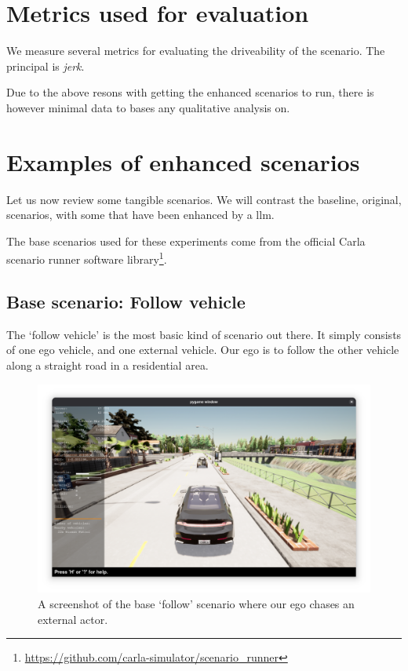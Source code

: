 \section{Metrics used for evaluation}

We measure several metrics for evaluating the driveability of the scenario. The
principal is \emph{jerk}.

Due to the above resons with getting the enhanced scenarios to run, there is
however minimal data to bases any qualitative analysis on.

\section{Examples of enhanced scenarios}

Let us now review some tangible scenarios. We will contrast the baseline, original, scenarios, with
some that have been enhanced by a \acrshort{llm}.

The base scenarios used for these experiments come from the official Carla scenario runner software
library\footnote{\url{https://github.com/carla-simulator/scenario_runner}}.

\subsection{Base scenario: Follow vehicle}\label{sec:followVehicleResults}

The `follow vehicle' is the most basic kind of scenario out there. It simply consists of one ego
vehicle, and one external vehicle. Our ego is to follow the other vehicle along a straight road in a
residential area.

\begin{figure}[htbp]
    \centering
    \includegraphics[width=\textwidth]{experiment-material/follow-base-startpoint.png}
    \caption{A screenshot of the base `follow' scenario where our ego chases an external actor.}\label{fig:followBaseStartpoint}
\end{figure}

